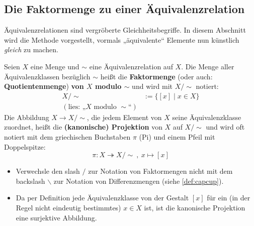 \subsection*{Die Faktormenge zu einer Äquivalenzrelation}


Äquivalenzrelationen sind vergröberte Gleichheitsbegriffe. In diesem Abschnitt wird die Methode vorgestellt, vormals „äquivalente“ Elemente nun künstlich \emph{gleich} zu machen.


\begin{de} \label{def:faktormenge}   
    Seien $X$ eine Menge und $\sim$ eine Äquivalenzrelation auf $X$. Die Menge aller Äquivalenzklassen bezüglich $\sim$ heißt die \textbf{Faktormenge} (oder auch: \textbf{Quotientenmenge}) \textbf{von $X$ modulo $\sim$} und wird mit $X/{\sim}$ notiert:
    \begin{align*}
        X/{\sim} & := \big\{ [x] \mid x\in X \big\} \\
        (\text{lies: „$X$ modulo ${\sim}$“}) &
    \end{align*}
    Die Abbildung $X\to X/{\sim}$, die jedem Element von $X$ seine Äquivalenzklasse zuordnet, heißt die \textbf{(kanonische) Projektion} von $X$ auf $X/{\sim}$ und wird oft notiert mit dem griechischen Buchstaben $\pi$ (Pi) und einem Pfeil mit Doppelspitze:
        \[ \pi : X \twoheadrightarrow X/{\sim}\ ,\ x \mapsto [x] \]
\end{de}


\begin{bem} \quad
    \begin{itemize}
        \item Verwechsle den slash $\slash$ zur Notation von Faktormengen nicht mit dem backslash $\backslash$ zur Notation von Differenzmengen (siehe \cref{def:capcup}).
        \item Da per Definition jede Äquivalenzklasse von der Gestalt $[x]$ für ein (in der Regel nicht eindeutig bestimmtes) $x\in X$ ist, ist die kanonische Projektion eine surjektive Abbildung.
    \end{itemize}
\end{bem}



